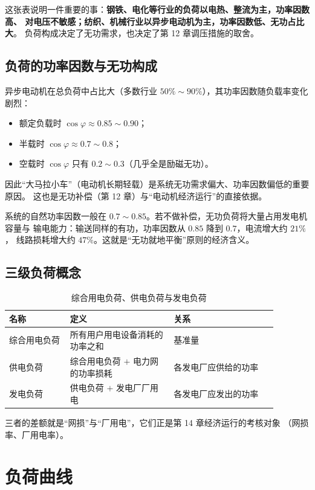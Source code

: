 这张表说明一件重要的事：\textbf{钢铁、电化等行业的负荷以电热、整流为主，功率因数高、
对电压不敏感；纺织、机械行业以异步电动机为主，功率因数低、无功占比大}。
负荷构成决定了无功需求，也决定了第 12 章调压措施的取舍。

\subsection{负荷的功率因数与无功构成}

异步电动机在总负荷中占比大（多数行业 $50\%\sim90\%$），其功率因数随负载率变化剧烈：
\begin{itemize}
  \item 额定负载时 $\cos\varphi\approx0.85\sim0.90$；
  \item 半载时 $\cos\varphi\approx0.7\sim0.8$；
  \item 空载时 $\cos\varphi$ 只有 $0.2\sim0.3$（几乎全是励磁无功）。
\end{itemize}
因此“大马拉小车”（电动机长期轻载）是系统无功需求偏大、功率因数偏低的重要原因。
这也是无功补偿（第 12 章）与“电动机经济运行”的直接依据。

系统的自然功率因数一般在 $0.7\sim0.85$。若不做补偿，无功负荷将大量占用发电机容量与
输电能力：输送同样的有功，功率因数从 $0.85$ 降到 $0.7$，电流增大约 $21\%$，
线路损耗增大约 $47\%$。这就是“无功就地平衡”原则的经济含义。

\subsection{三级负荷概念}

\begin{table}[htbp]
  \centering
  \caption{综合用电负荷、供电负荷与发电负荷}
  \small
  \begin{tabular}{@{}p{0.20\linewidth}p{0.34\linewidth}p{0.34\linewidth}@{}}
    \toprule
    名称 & 定义 & 关系 \\
    \midrule
    综合用电负荷 & 所有用户用电设备消耗的功率之和 & 基准量 \\
    供电负荷 & 综合用电负荷 $+$ 电力网的功率损耗 & 各发电厂应供给的功率 \\
    发电负荷 & 供电负荷 $+$ 发电厂厂用电 & 各发电厂应发出的功率 \\
    \bottomrule
  \end{tabular}
\end{table}

三者的差额就是“网损”与“厂用电”，它们正是第 14 章经济运行的考核对象
（网损率、厂用电率）。

\section{负荷曲线}

